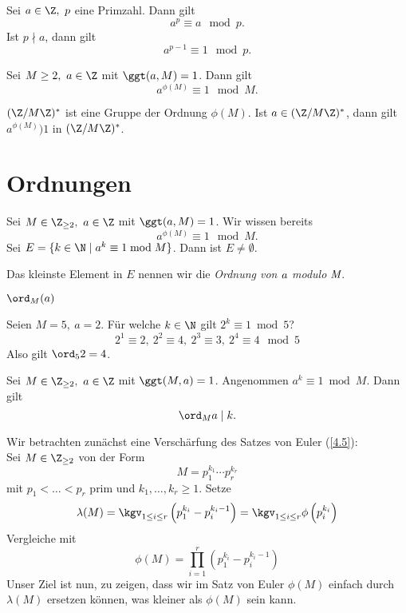 \begin{thm}\autolabel
	Sei $a \in \Z,\ p $ eine Primzahl. Dann gilt
	\[ a^p \equiv a \mod p. \]
	Ist $p \nmid a$, dann gilt
	\[ a^{p-1} \equiv 1 \mod p. \]
\end{thm}

\begin{thm}[Euler]\autolabel
	Sei $M \geq 2,\ a \in \Z$ mit $\ggt(a,M) = 1$. Dann gilt
	\[ a^{\phi(M)} \equiv 1 \mod M. \]
\end{thm}

\begin{rem*}
	$(\Z/M\Z)^*$ ist eine Gruppe der Ordnung $\phi(M)$. Ist $a \in (\Z/M\Z)^*$, dann gilt $a^{\phi(M)} ) 1$ in $(\Z/M\Z)^*$.
\end{rem*}

\section*{Ordnungen}

Sei $M \in \Z_{\geq 2},\ a \in \Z$ mit $\ggt(a,M)=1$. Wir wissen bereits 
\[ a^{\phi(M)} \equiv 1 \mod M. \]
Sei $E = \{k \in \N \mid a^k \equiv 1 \bmod M\}$. Dann ist $E \neq \emptyset$.

\begin{defn*}[Ordnung]
	Das kleinste Element in $E$ nennen wir die \emph{Ordnung von $\emph{a}$ modulo $\emph{M}$}.
	\begin{notat*}
		$\ord_M(a)$
	\end{notat*}
\end{defn*}

\begin{exmp*}
	Seien $M = 5,\ a= 2$. Für welche $k \in \N$ gilt $2^k \equiv 1 \bmod 5$?
	\[ 2^1 \equiv 2,\ 2^2 \equiv 4,\ 2^3 \equiv 3,\ 2^4 \equiv 4 \mod 5 \]
	Also gilt $\ord_5 2 = 4$.
\end{exmp*}

\begin{lem}\autolabel
	Sei $M \in \Z_{\geq 2},\ a \in \Z$ mit $\ggt(M,a)=1$. Angenommen $a^k \equiv 1 \bmod M$. Dann gilt
	\[ \ord_M a \mid k. \]
\end{lem}

\video Wir betrachten zunächst eine Verschärfung des Satzes von Euler (\ref{4.5}):\\
Sei $M \in \Z_{\geq 2}$ von der Form
\[ M = p_1^{k_1} \dotsm p_r^{k_r} \]
mit $p_1 < \dots < p_r$ prim und $k_1, \dotsc, k_r \geq 1$. Setze
\[ \lambda(M) = \kgv_{1 \leq i \leq r} \left( p_1^{k_i} - p_i^{k_i - 1} \right) = \kgv_{1 \leq i \leq r} \phi\left(p_i^{k_i}\right) \]
Vergleiche mit
\[ \phi(M) = \prod_{i=1}^r \left( p_1^{k_i} - p_i^{k_i - 1} \right) \]
Unser Ziel ist nun, zu zeigen, dass wir im Satz von Euler $\phi(M)$ einfach durch $\lambda(M)$ ersetzen können, was kleiner als $\phi(M)$ sein kann.

